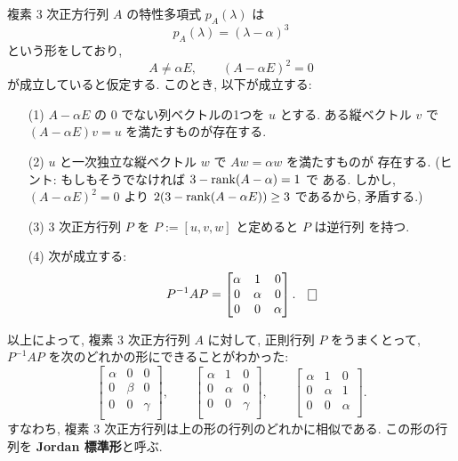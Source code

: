 \documentclass[12pt,twoside]{jarticle}
\begin{document}
\begin{question}[15点]
  \label{q:normal-form-3.5}
  複素 $3$ 次正方行列 $A$ の特性多項式 $p_A(\lambda)$ は
  \begin{equation*}
    p_A(\lambda) = (\lambda - \alpha)^3
  \end{equation*}
  という形をしており,
  \begin{equation*}
    A \ne \alpha E, \qquad (A - \alpha E)^2 = 0
  \end{equation*}
  が成立していると仮定する.  このとき, 以下が成立する:
  \begin{enumerate}
  \item[(1)] $A - \alpha E$ の $0$ でない列ベクトルの1つを $u$ とする.
    ある縦ベクトル $v$ で $(A - \alpha E)v = u$ を満たすものが存在する.
  \item[(2)] $u$ と一次独立な縦ベクトル $w$ で $Aw=\alpha w$ を満たすものが
    存在する.  (ヒント: もしもそうでなければ $3 - \mathop{\mathrm{rank}}\nolimits(A - \alpha) = 1$ で
    ある.  しかし, $(A - \alpha E)^2 = 0$ より %
    $2(3 - \mathop{\mathrm{rank}}\nolimits(A - \alpha E)) \ge 3$ であるから, 矛盾する.)
  \item[(3)] $3$ 次正方行列 $P$ を $P := [u, v, w]$ と定めると $P$ は逆行列
    を持つ. 
  \item[(4)] 次が成立する:
    \begin{equation*}
      P^{-1} A P 
      = 
      \begin{bmatrix}
        \alpha & 1 & 0 \\
        0 & \alpha & 0 \\
        0 & 0 & \alpha \\
      \end{bmatrix}.
      \qed
    \end{equation*}
  \end{enumerate}
\end{question}

以上によって, 複素 $3$ 次正方行列 $A$ に対して, 正則行列 $P$ をうまくとって,
$P^{-1}AP$ を次のどれかの形にできることがわかった:
\begin{equation*}
  \begin{bmatrix}
    \alpha & 0 & 0 \\
    0 & \beta  & 0 \\
    0 & 0 & \gamma \\
  \end{bmatrix},
  \qquad
  \begin{bmatrix}
    \alpha & 1 & 0 \\
    0 & \alpha & 0 \\
    0 & 0 & \gamma \\
  \end{bmatrix},
  \qquad
  \begin{bmatrix}
    \alpha & 1 & 0 \\
    0 & \alpha & 1 \\
    0 & 0 & \alpha \\
  \end{bmatrix}.
\end{equation*}
すなわち, 複素 $3$ 次正方行列は上の形の行列のどれかに相似である.  この形の行
列を {\bf Jordan 標準形}と呼ぶ.
\end{document}
